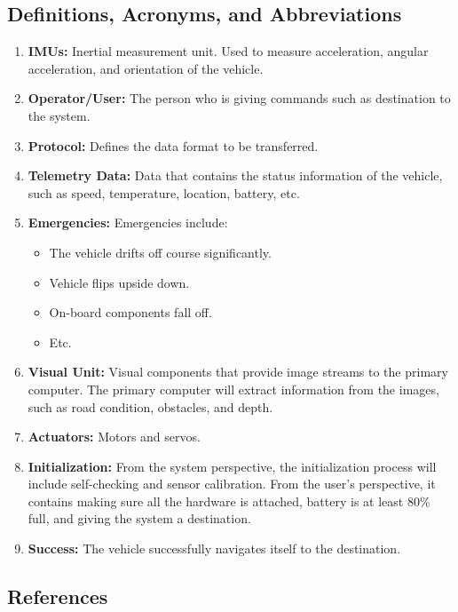 \documentclass[compsoc,draftclsnofoot,onecolumn,10pt]{IEEEtran}
\begin{document}
\subsection{Definitions, Acronyms, and Abbreviations} %
\begin{enumerate}
	\item \textbf{IMUs:} Inertial measurement unit. Used to measure 
acceleration, angular acceleration, and orientation of the vehicle.
	\item \textbf{Operator/User:} The person who is giving commands 
such as destination to the system.
	\item \textbf{Protocol:} Defines the data format to be 
transferred.
	\item \textbf{Telemetry Data:} Data that contains the status 
information of the vehicle, such as speed, temperature, location, battery, etc.
	\item \textbf{Emergencies:} Emergencies include: 
	\begin{itemize}
		\item The vehicle drifts off course significantly.
		\item Vehicle flips upside down.
		\item On-board components fall off.
		\item Etc.
	\end{itemize}
	\item \textbf{Visual Unit:} Visual components that provide 
image streams to the primary computer. The primary computer will extract 
information from the images, such as road condition, obstacles, and depth. 
	\item \textbf{Actuators:} Motors and servos.
	\item \textbf{Initialization:} From the system perspective, the initialization
	process will include self-checking and sensor calibration. From the user's 
	perspective, it contains making sure all the hardware is attached, battery is 
	at least 80\% full, and giving the system a destination. 
	\item \textbf{Success:} The vehicle successfully navigates itself to the 
	destination.
\end{enumerate}

\subsection{References} %


\end{document}
